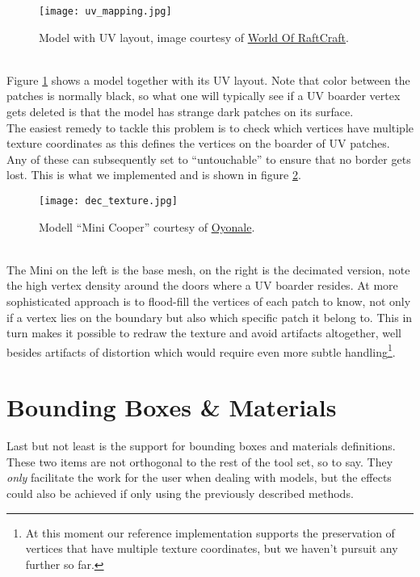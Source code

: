 \begin{figure}[htb]
\center
\texttt{[image: uv\_mapping.jpg]}
\caption{Model with UV layout, image courtesy of \href{http://blogs.gscept.com/2008/sg2/index.php/page/2/index.html}{World Of RaftCraft}.}
\label{fig:uv_mapping}
\end{figure}\\
Figure \ref{fig:uv_mapping} shows a model together with its UV layout.
Note that color between the patches is normally black, so what one will typically see if a UV boarder vertex gets deleted is that the model has strange dark patches on its surface.\\
The easiest remedy to tackle this problem is to check which vertices have multiple texture coordinates as this defines the vertices on the boarder of UV patches.
Any of these can subsequently set to ``untouchable'' to ensure that no border gets lost.
This is what we implemented and is shown in figure \ref{fig:dec_texture}.
\begin{figure}[htb]
\center
\texttt{[image: dec\_texture.jpg]}
\caption{Modell ``Mini Cooper'' courtesy of \href{http://www.oyonale.com}{Oyonale}.}
\label{fig:dec_texture}
\end{figure}\\
The Mini on the left is the base mesh, on the right is the decimated version, note the high vertex density around the doors where a UV boarder resides.
At more sophisticated approach is to flood-fill the vertices of each patch to know, not only if a vertex lies on the boundary but also which specific patch it belong to.
This in turn makes it possible to redraw the texture and avoid artifacts altogether, well besides artifacts of distortion which would require even more subtle handling\footnote{ At this moment our reference implementation supports the preservation of vertices that have multiple texture coordinates, but we haven't pursuit any further so far.}. 


\section{Bounding Boxes \& Materials}
\label{topstoc43}

Last but not least is the support for bounding boxes and materials definitions.
These two items are not orthogonal to the rest of the tool set, so to say.
They \textit{only} facilitate the work for the user when dealing with models, but the effects could also be achieved if only using the previously described methods.

